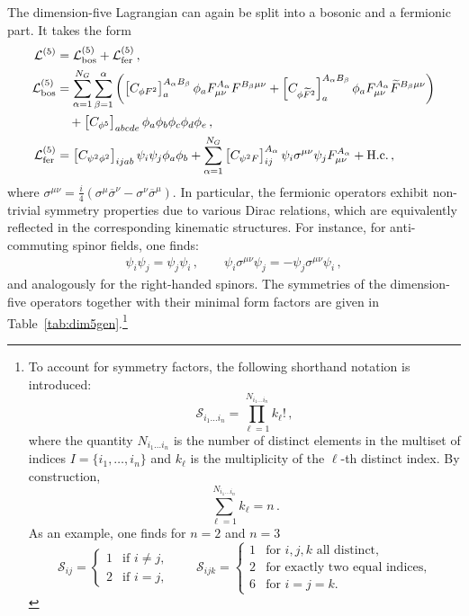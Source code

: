 The dimension-five Lagrangian can again be split into a bosonic and a fermionic part. It takes the form
\begin{align}
    \mathcal{L}^{(5)} &= \mathcal{L}^{(5)}_{\text{bos}} + \mathcal{L}^{(5)}_{\text{fer}}\,,\label{eq:L5}\\
    \mathcal{L}^{(5)}_{\text{bos}}&=\sum_{\alpha=1}^{N_G}\sum_{\beta=1}^\alpha \left(\left[C_{\phi F^2}\right]^{A_\alpha B_\beta}_{a}\phi_{a}F^{A_\alpha}_{\mu\nu}F^{B_\beta  \mu\nu}+\left[C_{\phi \widetilde{F}^2}\right]^{A_\alpha B_\beta}_{a}\phi_{a}F^{A_\alpha}_{\mu\nu}\widetilde{F}^{B_\beta  \mu\nu}\right)
    \nonumber\\&\quad 
    + \left[C_{\phi^5}\right]_{abcde}\phi_{a}\phi_{b}\phi_{c}\phi_{d}\phi_{e}\,,\\
    \mathcal{L}^{(5)}_{\text{fer}} &= \left[C_{\psi^2\phi^2}\right]_{ijab} \psi_i \psi_j \phi_a \phi_b + \sum_{\alpha=1}^{N_G} \left[C_{\psi^2F}\right]_{ij}^{A_\alpha} \psi_i \sigma^{\mu\nu} \psi_j F_{\mu\nu}^{A_\alpha}  + \text{H.c.}\,,
\end{align}
where $\sigma^{\mu\nu} = \frac{i}{4}(\sigma^\mu \overline \sigma^\nu - \sigma^\nu \overline \sigma^\mu)$. In particular, the fermionic operators exhibit non-trivial symmetry properties due to various Dirac relations, which are equivalently reflected in the corresponding kinematic structures. For instance, for anti-commuting spinor fields, one finds:
%
\begin{gather}
    \psi_i \psi_j = \psi_j\psi_i\,, \qquad
    \psi_i \sigma^{\mu\nu} \psi_j = -\psi_j \sigma^{\mu\nu}\psi_i\,,
\end{gather}
and analogously for the right-handed spinors. The symmetries of the dimension-five operators together with their minimal form factors are given in Table~\ref{tab:dim5gen}.\footnote{To account for symmetry factors, the following shorthand notation is introduced:
\begin{equation}
\mathcal S_{i_1\dots i_n}=\prod_{\ell=1}^{N_{i_1\dots i_n}} k_\ell !\,,
\label{eq:symm_fact}
\end{equation}
where the quantity $N_{i_1\dots i_n}$ is the number of distinct elements in the multiset of indices $I=\{i_1,\dotsc, i_n\}$ and $k_\ell$ is the multiplicity of the $\ell$-th distinct index.
By construction,
\begin{equation}
\sum_{\ell=1}^{N_{i_1\dots i_n}}k_\ell=n\,.
\end{equation}
As an example, one finds for $n=2$ and $n=3$
\begin{equation}
\mathcal S_{ij} = \begin{cases}
1 & \text{if }i\neq j, \\
2 & \text{if }i=j,
\end{cases} \qquad 
\mathcal S_{ijk} =
\begin{cases}
1 & \text{for } i,j,k \text{ all distinct}, \\
2 & \text{for exactly two equal indices}, \\
6 & \text{for } i=j=k.
\end{cases}
\end{equation}}

